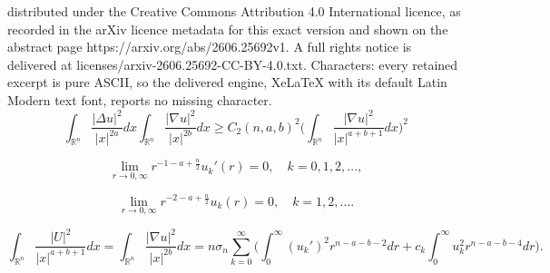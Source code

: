 \documentclass[10pt,a4paper]{amsart}
\def\R{\mathbb R}%
\def\irn{\int_{\R^n}}
\begin{document}
distributed under the Creative Commons Attribution 4.0 International licence, as recorded in the arXiv licence metadata for this exact version and shown on the abstract page https://arxiv.org/abs/2606.25692v1. A full rights notice is delivered at licenses/arxiv-2606.25692-CC-BY-4.0.txt. Characters: every retained excerpt is pure ASCII, so the delivered engine, XeLaTeX with its default Latin Modern text font, reports no missing character.
\begin{equation}\label{eq:2ndCKNnew}
\irn \frac{|\Delta u|^2}{|x|^{2a}} dx \irn \frac{|\nabla u|^2}{|x|^{2b}} dx \geq C_2(n,a,b)^2 \Big(\irn \frac{|\nabla u|^2}{|x|^{a+b +1}} dx\Big)^2
\end{equation}

\begin{equation}\label{eq:daohamukbehavior}
\lim_{r \to 0, \infty} r^{-1-a +\frac n2}u_k'(r) =0,\quad k =0,1,2,\ldots,
\end{equation}

\begin{equation}\label{eq:ukbehavior}
\lim_{r \to 0, \infty} r^{-2-a +\frac n2}u_k(r) =0,\quad k =1,2,\ldots.
\end{equation}

\begin{equation}\label{eq:nablaab}
\irn \frac{|U|^2}{|x|^{a+b+1}} dx =\irn \frac{|\nabla u|^2}{|x|^{2b}} dx =n\sigma_n \sum_{k=0}^\infty\Bigg(\int_0^\infty (u_k')^2 r^{n-a -b-2} dr + c_k \int_0^\infty u_k^2 r^{n -a-b -4} dr\Bigg).
\end{equation}
\end{document}
